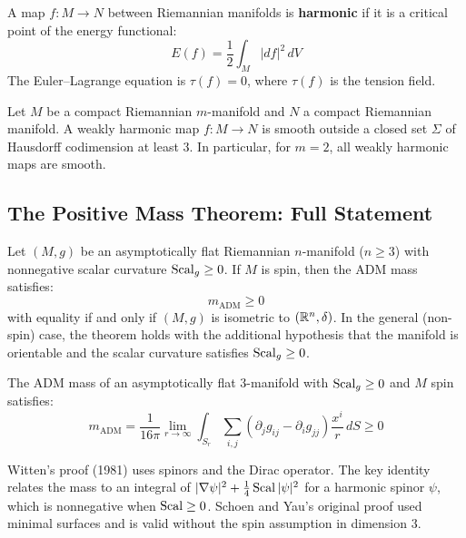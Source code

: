 \begin{definition}
A map $f: M \to N$ between Riemannian manifolds is \textbf{harmonic} if it is a critical point of the energy functional:
\[
E(f) = \frac{1}{2} \int_M |df|^2 \, dV
\]
The Euler--Lagrange equation is $\tau(f) = 0$, where $\tau(f)$ is the tension field.
\end{definition}

\begin{theorem}
Let $M$ be a compact Riemannian $m$-manifold and $N$ a compact Riemannian manifold. A weakly harmonic map $f: M \to N$ is smooth outside a closed set $\Sigma$ of Hausdorff codimension at least $3$. In particular, for $m = 2$, all weakly harmonic maps are smooth.
\end{theorem}

\subsection{The Positive Mass Theorem: Full Statement}

\begin{theorem}
Let $(M, g)$ be an asymptotically flat Riemannian $n$-manifold ($n \geq 3$) with nonnegative scalar curvature $\operatorname{Scal}_g \geq 0$. If $M$ is spin, then the ADM mass satisfies:
\[
m_{\text{ADM}} \geq 0
\]
with equality if and only if $(M, g)$ is isometric to $(\mathbb{R}^n, \delta)$. In the general (non-spin) case, the theorem holds with the additional hypothesis that the manifold is orientable and the scalar curvature satisfies $\operatorname{Scal}_g \geq 0$.
\end{theorem}

\begin{corollary}
The ADM mass of an asymptotically flat $3$-manifold with $\operatorname{Scal}_g \geq 0$ and $M$ spin satisfies:
\[
m_{\text{ADM}} = \frac{1}{16\pi} \lim_{r \to \infty} \int_{S_r} \sum_{i,j} (\partial_j g_{ij} - \partial_i g_{jj}) \frac{x^i}{r} \, dS \geq 0
\]
\end{corollary}

\begin{remark}
Witten's proof (1981) uses spinors and the Dirac operator. The key identity relates the mass to an integral of $|\nabla \psi|^2 + \frac{1}{4}\operatorname{Scal} |\psi|^2$ for a harmonic spinor $\psi$, which is nonnegative when $\operatorname{Scal} \geq 0$. Schoen and Yau's original proof used minimal surfaces and is valid without the spin assumption in dimension $3$.
\end{remark}

